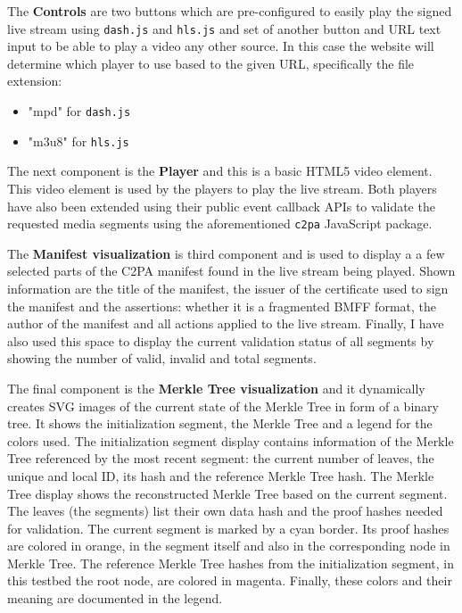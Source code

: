 The \textbf{Controls} are two buttons which are pre-configured to easily play the signed live stream using \texttt{dash.js} and \texttt{hls.js} and set of another button and URL text input to be able to play a video any other source. In this case the website will determine which player to use based to the given URL, specifically the file extension:

\begin{itemize}
    \item "mpd" for \texttt{dash.js}
    \item "m3u8" for \texttt{hls.js}
\end{itemize}

The next component is the \textbf{Player} and this is a basic HTML5 video element. This video element is used by the players to play the live stream. Both players have also been extended using their public event callback APIs to validate the requested media segments using the aforementioned \texttt{c2pa} JavaScript package.

The \textbf{Manifest visualization} is third component and is used to display a a few selected parts of the C2PA manifest found in the live stream being played. Shown information are the title of the manifest, the issuer of the certificate used to sign the manifest and the assertions: whether it is a fragmented BMFF format, the author of the manifest and all actions applied to the live stream. Finally, I have also used this space to display the current validation status of all segments by showing the number of valid, invalid and total segments.

The final component is the \textbf{Merkle Tree visualization} and it dynamically creates SVG images of the current state of the Merkle Tree in form of a binary tree. It shows the initialization segment, the Merkle Tree and a legend for the colors used. The initialization segment display contains information of the Merkle Tree referenced by the most recent segment: the current number of leaves, the unique and local ID, its hash and the reference Merkle Tree hash. The Merkle Tree display shows the reconstructed Merkle Tree based on the current segment. The leaves (the segments) list their own data hash and the proof hashes needed for validation. The current segment is marked by a cyan border. Its proof hashes are colored in orange, in the segment itself and also in the corresponding node in Merkle Tree. The reference Merkle Tree hashes from the initialization segment, in this testbed the root node, are colored in magenta. Finally, these colors and their meaning are documented in the legend.


